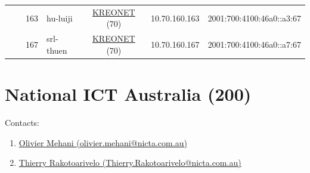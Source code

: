 \begin{small}
\begin{center}
\begin{longtable}{|c|c|c|c|c|c|c|c|}
  &  & \tiny{163} & \multicolumn{1}{|l|}{\tiny{hu-luiji}} & \multicolumn{2}{|c|}{\tiny{\href{http://www.kreonet.net}{KREONET} (70)}} & \tiny{10.70.160.163} & \tiny{2001:700:4100:46a0::a3:67} \\* \cline{3-3}\cline{4-4}\cline{5-5}\cline{6-6}\cline{7-7}\cline{8-8}
  &  & \tiny{167} & \multicolumn{1}{|l|}{\tiny{srl-thuen}} & \multicolumn{2}{|c|}{\tiny{\href{http://www.kreonet.net}{KREONET} (70)}} & \tiny{10.70.160.167} & \tiny{2001:700:4100:46a0::a7:67} \\ \hline
\end{longtable}
\end{center}
\end{small}



\section{National ICT Australia (200)}
\label{sec:NICTA}

Contacts:
\begin{enumerate}
 \item {}\href{mailto:olivier.mehani@nicta.com.au}{Olivier Mehani (olivier.mehani@nicta.com.au)}
 \item {}\href{mailto:Thierry.Rakotoarivelo@nicta.com.au}{Thierry Rakotoarivelo (Thierry.Rakotoarivelo@nicta.com.au)}
\end{enumerate}

